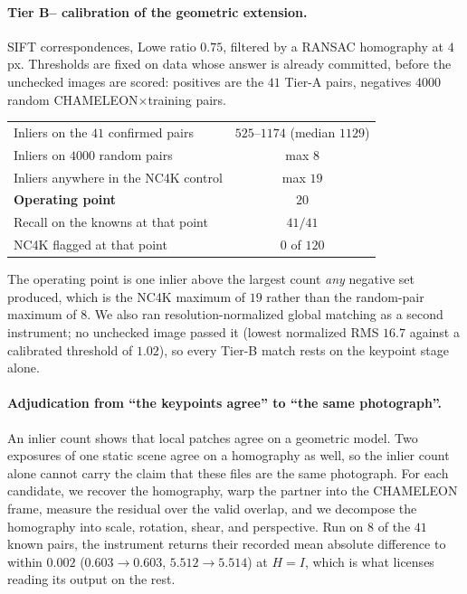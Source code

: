 \documentclass{article}
\begin{document}
\paragraph{Tier B-- calibration of the geometric extension.} SIFT correspondences, Lowe ratio
$0.75$, filtered by a RANSAC homography at $4$ px. Thresholds are fixed on data whose answer is
already committed, before the unchecked images are scored: positives are the $41$ Tier-A pairs,
negatives $4000$ random CHAMELEON$\times$training pairs.

\begin{center}\small
\begin{tabular}{lc}
\toprule
Inliers on the $41$ confirmed pairs & $525$--$1174$ (median $1129$) \\
Inliers on $4000$ random pairs & max $8$ \\
Inliers anywhere in the NC4K control & max $19$ \\
\textbf{Operating point} & \textbf{$20$} \\
Recall on the knowns at that point & $41/41$ \\
NC4K flagged at that point & $0$ of $120$ \\
\bottomrule
\end{tabular}
\end{center}

The operating point is one inlier above the largest count \emph{any} negative set produced, which is
the NC4K maximum of $19$ rather than the random-pair maximum of $8$. We also ran resolution-normalized
global matching as a second instrument; no unchecked image passed it (lowest normalized RMS $16.7$
against a calibrated threshold of $1.02$), so every Tier-B match rests on the keypoint stage alone.

\paragraph{Adjudication from ``the keypoints agree'' to ``the same photograph''.} An inlier count
shows that local patches agree on a geometric model. Two exposures of one static scene agree on a
homography as well, so the inlier count alone cannot carry the claim that these files are the same
photograph. For each candidate, we recover the homography, warp the partner into the CHAMELEON frame, measure the residual over the valid overlap, and we decompose the homography into scale,
rotation, shear, and perspective. Run on $8$ of the $41$ known pairs, the instrument returns their
recorded mean absolute difference to within $0.002$ ($0.603 \to 0.603$, $5.512 \to 5.514$) at
$H = I$, which is what licenses reading its output on the rest.
\end{document}
